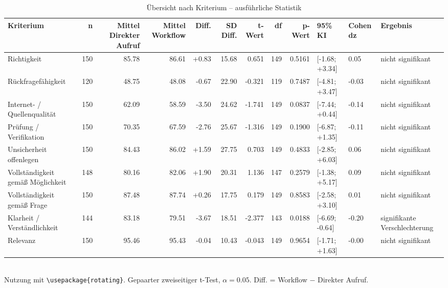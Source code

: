 \begin{table}
\centering
\caption{Übersicht nach Kriterium -- ausführliche Statistik}
\begin{tabular}{lrrrrrrrrlll}
\toprule
Kriterium & n & Mittel Direkter Aufruf & Mittel Workflow & Diff. & SD Diff. & t-Wert & df & p-Wert & 95\% KI & Cohen dz & Ergebnis \\
\midrule
Richtigkeit & 150 & 85.78 & 86.61 & +0.83 & 15.68 & 0.651 & 149 & 0.5161 & [-1.68; +3.34] & 0.05 & nicht signifikant \\
Rückfragefähigkeit & 120 & 48.75 & 48.08 & -0.67 & 22.90 & -0.321 & 119 & 0.7487 & [-4.81; +3.47] & -0.03 & nicht signifikant \\
Internet- / Quellenqualität & 150 & 62.09 & 58.59 & -3.50 & 24.62 & -1.741 & 149 & 0.0837 & [-7.44; +0.44] & -0.14 & nicht signifikant \\
Prüfung / Verifikation & 150 & 70.35 & 67.59 & -2.76 & 25.67 & -1.316 & 149 & 0.1900 & [-6.87; +1.35] & -0.11 & nicht signifikant \\
Unsicherheit offenlegen & 150 & 84.43 & 86.02 & +1.59 & 27.75 & 0.703 & 149 & 0.4833 & [-2.85; +6.03] & 0.06 & nicht signifikant \\
Vollständigkeit gemäß Möglichkeit & 148 & 80.16 & 82.06 & +1.90 & 20.31 & 1.136 & 147 & 0.2579 & [-1.38; +5.17] & 0.09 & nicht signifikant \\
Vollständigkeit gemäß Frage & 150 & 87.48 & 87.74 & +0.26 & 17.75 & 0.179 & 149 & 0.8583 & [-2.58; +3.10] & 0.01 & nicht signifikant \\
Klarheit / Verständlichkeit & 144 & 83.18 & 79.51 & -3.67 & 18.51 & -2.377 & 143 & 0.0188 & [-6.69; -0.64] & -0.20 & signifikante Verschlechterung \\
Relevanz & 150 & 95.46 & 95.43 & -0.04 & 10.43 & -0.043 & 149 & 0.9654 & [-1.71; +1.63] & -0.00 & nicht signifikant \\
\bottomrule
\end{tabular}
\\[2mm]
\footnotesize Nutzung mit \texttt{\textbackslash usepackage\{rotating\}}. Gepaarter zweiseitiger t-Test, $\alpha=0.05$. Diff. = Workflow $-$ Direkter Aufruf.
\end{table}
